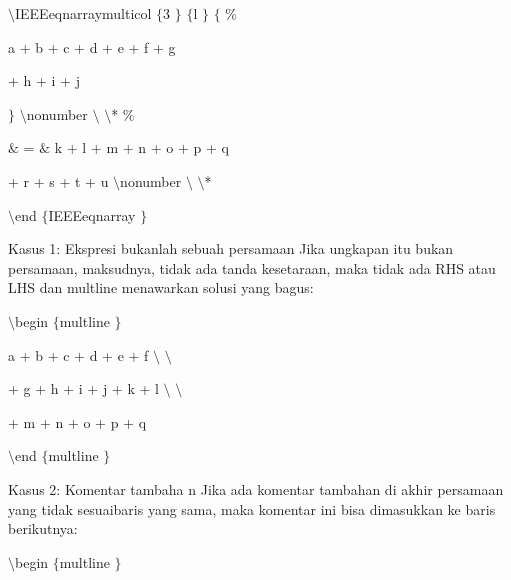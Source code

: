 \noindent 
 $  \setminus  $IEEEeqnarraymulticol $  \{  $3 $  \}  $ $  \{  $l $  \}  $ $  \{  $ $  \%  $ \par
\vspace{12pt}
\noindent 
a + b + c + d + e + f + g \par
\vspace{12pt}
\noindent 
+ h + i + j \par
\vspace{12pt}
\noindent 
 $  \}  $ $  \setminus  $nonumber $  \setminus  $ $  \setminus  $* $  \%  $ \par
\vspace{12pt}
\noindent 
 $  \&  $ =  $  \&  $ k + l + m + n + o + p + q \par
\vspace{12pt}
\noindent 
+ r + s + t + u  $  \setminus  $nonumber $  \setminus  $ $  \setminus  $* \par
\vspace{12pt}
\noindent 
 $  \setminus  $end $  \{  $IEEEeqnarray $  \}  $ \par
\vspace{12pt}
\vspace{12pt}
\noindent 
Kasus 1: Ekspresi bukanlah sebuah persamaan Jika ungkapan itu bukan persamaan, maksudnya, tidak ada tanda kesetaraan, maka tidak ada RHS atau LHS dan multline menawarkan solusi yang bagus: \par
\vspace{12pt}
\noindent 
 $  \setminus  $begin $  \{  $multline $  \}  $ \par
\vspace{12pt}
\noindent 
a + b + c + d + e + f  $  \setminus  $ $  \setminus  $ \par
\vspace{12pt}
\noindent 
+ g + h + i + j + k + l  $  \setminus  $ $  \setminus  $ \par
\vspace{12pt}
\noindent 
+ m + n + o + p + q \par
\vspace{12pt}
\noindent 
 $  \setminus  $end $  \{  $multline $  \}  $ \par
\vspace{12pt}
\noindent 
Kasus 2: Komentar tambaha n Jika ada komentar tambahan di akhir persamaan yang tidak sesuaibaris yang sama, maka komentar ini bisa dimasukkan ke baris berikutnya: \par
\vspace{12pt}
\noindent 
 $  \setminus  $begin $  \{  $multline $  \}  $ \par
